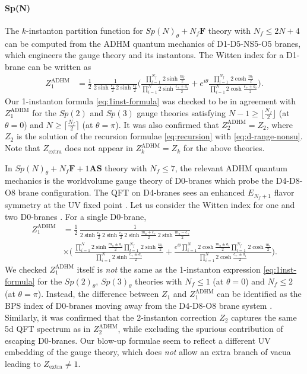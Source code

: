 \documentclass[letterpaper, 11pt]{article}
\newcommand{\nn}{\nonumber}
\def\e{\epsilon}
\begin{document}
{\paragraph{Sp(N)}
The $k$-instanton partition function for $Sp(N)_\theta + N_f \mathbf{F}$ theory with $N_f \leq 2N+4$ can be computed from the ADHM quantum mechanics of D1-D5-NS5-O5 branes, which engineers the gauge theory and its instantons. The Witten index for a D1-brane can be written as
\begin{align}
  Z_1^\text{ADHM} &= \frac{1}{2}\,\frac{1}{2\sinh\frac{\e_1}{2}\,2\sinh\frac{\e_2}{2}}\Bigg(\frac{\prod_{l=1}^{N_f}\,2\sinh\frac{m_l}{2}}{\prod_{i=1}^{N}2\sinh\frac{\e_+\pm a_i}{2}}+e^{i\theta}\frac{\prod_{l=1}^{N_f}\,2\cosh\frac{m_l}{2}}{\prod_{i=1}^{N}2\cosh\frac{\e_+\pm a_i}{2}}\Bigg).
\end{align}
Our 1-instanton formula \eqref{eq:1inst-formula} was checked to be in agreement with $Z_1^\text{ADHM}$ for the $Sp(2)$ and $Sp(3)$ gauge theories satisfying $N-1 \geq \lfloor \frac{N_f}{2} \rfloor$ (at $\theta = 0$) and $N \geq \lceil \frac{N_f}{2} \rceil$ (at $\theta = \pi$). 
It was also confirmed that $Z_2^\text{ADHM} =  Z_2$, where $Z_2$ is the solution of the recursion formulae \eqref{eq:recursion} with \eqref{eq:d-range-nonsu}. Note that $Z_\text{extra}$ does not appear in $Z_k^\text{ADHM} = Z_k $ for the above theories.


In $Sp(N)_\theta + N_f \mathbf{F} + 1\mathbf{AS}$ theory with $N_f \leq 7$, the relevant ADHM quantum mechanics is the worldvolume gauge theory of D0-branes which probe the D4-D8-O8 brane configuration. The QFT on D4-branes sees an enhanced $E_{N_f + 1}$ flavor symmetry at the UV fixed point \cite{Seiberg:1996bd}. Let us consider the Witten index for one and two D0-branes \cite{Kim:2012gu,Hwang:2014uwa}. For a single D0-brane, 
\begin{align}
  Z_1^{\text{ADHM}}&=\frac{1}{2} \, \frac{1}{2\sinh\frac{\e_1}{2}\,2\sinh\frac{\e_2}{2}\, 2\sinh\frac{m_a+ \e_+}{2} \, 2\sinh\frac{m_a-\e_+}{2}} \\& \times\Bigg(\,\frac{\prod_{i=1}^{N}2\sinh\frac{m_a\pm a_i}{2}\prod_{l=1}^{N_f}\,2\sinh\frac{m_l}{2}}{\prod_{i=1}^{N}2\sinh\frac{\e_+\pm a_i}{2}}
  +\frac{e^{i\theta}\prod_{i=1}^{N}2\cosh\frac{m_a\pm a_i}{2}\prod_{l=1}^{N_f}\,2\cosh\frac{m_l}{2}}{ \prod_{i=1}^{N}2\cosh\frac{\e_+\pm a_i}{2}}\Bigg).\nn
\end{align}
We checked $Z_1^{\text{ADHM}}$ itself is \emph{not} the same as the 1-instanton expression \eqref{eq:1inst-formula} for the $Sp(2)_\theta$, $Sp(3)_\theta$ theories with $N_f \leq 1$ (at $\theta=0$) and $N_f \leq 2$ (at $\theta=\pi$). Instead, the difference between $Z_1$ and $Z_1^{\text{ADHM}}$ can be identified as the BPS index of D0-branes moving away from the D4-D8-O8 brane system \cite{Kim:2012gu,Hwang:2014uwa}. Similarly, it was confirmed that the 2-instanton correction $Z_2$ captures the same 5d QFT spectrum as in $Z_2^\text{ADHM}$, while excluding the spurious contribution of escaping D0-branes. Our blow-up formulae seem to reflect a different UV embedding of the gauge theory, which does \emph{not} allow an extra branch of vacua  leading  to $Z_\text{extra} \neq 1$.


}
\end{document}
